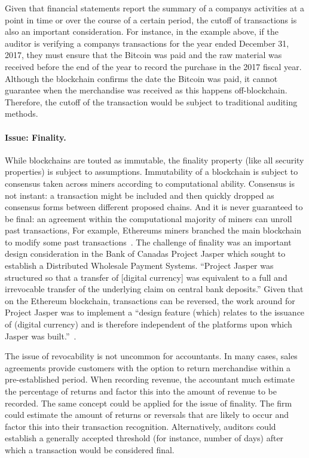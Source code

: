Given that financial statements report the summary of a company\textquotesingle s activities at a point in time or over the course of a certain period, the cutoff of transactions is also an important consideration. For instance, in the example above, if the auditor is verifying a company\textquotesingle s transactions for the year ended December 31, 2017, they must ensure that the Bitcoin was paid and the raw material was received before the end of the year to record the purchase in the 2017 fiscal year. Although the blockchain confirms the date the Bitcoin was paid, it cannot guarantee when the merchandise was received as this happens off-blockchain. Therefore, the cutoff of the transaction would be subject to traditional auditing methods. 

\paragraph{Issue: Finality.} While blockchains are touted as immutable, the finality property (like all security properties) is subject to assumptions. Immutability of a blockchain is subject to consensus taken across miners according to computational ability. Consensus is not instant: a transaction might be included and then quickly dropped as consensus forms between different proposed chains. And it is never guaranteed to be final: an agreement within the computational majority of miners can unroll past transactions, For example, Ethereum\textquotesingle s miners branched the main blockchain to modify some past transactions~\cite{dupont2017experiments}. The challenge of finality was an important design consideration in the Bank of Canada\textquotesingle s Project Jasper which sought to establish a Distributed Wholesale Payment Systems. ``Project Jasper was structured so that a transfer of [digital currency] was equivalent to a full and irrevocable transfer of the underlying claim on central bank deposits.” Given that on the Ethereum blockchain, transactions can be reversed, the work around for Project Jasper was to implement a “design feature (which) relates to the issuance of (digital currency) and is therefore independent of the platforms upon which Jasper was built.''~\cite{chapman2017project}.

The issue of revocability is not uncommon for accountants. In many cases, sales agreements provide customers with the option to return merchandise within a pre-established period. When recording revenue, the accountant much estimate the percentage of returns and factor this into the amount of revenue to be recorded. The same concept could be applied for the issue of finality. The firm could estimate the amount of returns or reversals that are likely to occur and factor this into their transaction recognition. Alternatively, auditors could establish a generally accepted threshold (for instance, number of days) after which a transaction would be considered final. 

